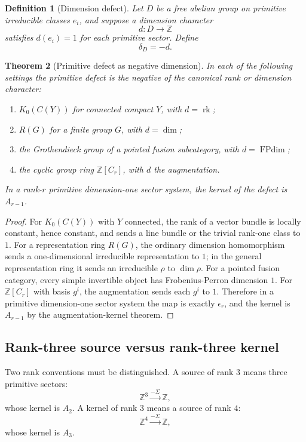 \documentclass[11pt]{amsart}
\newtheorem{theorem}{Theorem}[section]
\newtheorem{definition}[theorem]{Definition}
\DeclareMathOperator{\FPdim}{FPdim}
\newcommand{\ZZ}{\mathbb Z}
\begin{document}
\begin{definition}[Dimension defect]
Let $D$ be a free abelian group on primitive irreducible classes $e_i$, and suppose a dimension character
\[
      d:D\to\ZZ
\]
satisfies $d(e_i)=1$ for each primitive sector.  Define
\[
      \delta_D=-d.
\]
\end{definition}

\begin{theorem}[Primitive defect as negative dimension]
In each of the following settings the primitive defect is the negative of the canonical rank or dimension character:
\begin{enumerate}[label=(\alph*)]
\item $K_0(C(Y))$ for connected compact $Y$, with $d=\operatorname{rk}$;
\item $R(G)$ for a finite group $G$, with $d=\dim$;
\item the Grothendieck group of a pointed fusion subcategory, with $d=\FPdim$;
\item the cyclic group ring $\ZZ[C_r]$, with $d$ the augmentation.
\end{enumerate}
In a rank-$r$ primitive dimension-one sector system, the kernel of the defect is $A_{r-1}$.
\end{theorem}

\begin{proof}
For $K_0(C(Y))$ with $Y$ connected, the rank of a vector bundle is locally constant, hence constant, and sends a line bundle or the trivial rank-one class to $1$.  For a representation ring $R(G)$, the ordinary dimension homomorphism sends a one-dimensional irreducible representation to $1$; in the general representation ring it sends an irreducible $\rho$ to $\dim\rho$.  For a pointed fusion category, every simple invertible object has Frobenius-Perron dimension $1$.  For $\ZZ[C_r]$ with basis $g^i$, the augmentation sends each $g^i$ to $1$.  Therefore in a primitive dimension-one sector system the map is exactly $\epsilon_r$, and the kernel is $A_{r-1}$ by the augmentation-kernel theorem.\end{proof}

\subsection{Rank-three source versus rank-three kernel}

Two rank conventions must be distinguished.  A source of rank $3$ means three primitive sectors:
\[
      \ZZ^3\xrightarrow{-\Sigma}\ZZ,
\]
whose kernel is $A_2$.  A kernel of rank $3$ means a source of rank $4$:
\[
      \ZZ^4\xrightarrow{-\Sigma}\ZZ,
\]
whose kernel is $A_3$.
\end{document}
